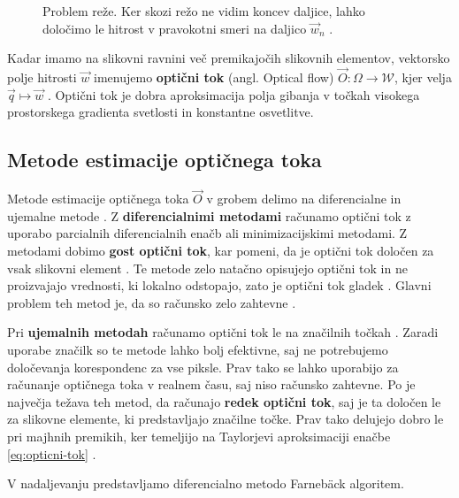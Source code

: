 \begin{figure}[htb]
\centering

\caption[Problem reže]{Problem reže. Ker skozi režo ne vidim koncev daljice, lahko določimo le hitrost v pravokotni smeri na daljico $\vec{w}_n$ \cite{trucco1998introductory}.}
\label{fig:aperture-problem}
\end{figure}




Kadar imamo na slikovni ravnini več premikajočih slikovnih elementov, vektorsko polje hitrosti $\vec{w}$ imenujemo \textbf{optični tok} (angl. Optical flow) $\vec{O}: \mathit{\Omega} \to \mathcal{W}$, kjer velja $ \vec{q} \mapsto \vec{w}$ \cite{trucco1998introductory}. Optični tok je dobra aproksimacija polja gibanja v točkah visokega prostorskega gradienta svetlosti in konstantne osvetlitve.



\subsection{Metode estimacije optičnega toka}\label{sec:metode-of}

Metode estimacije optičnega toka $\vec{O}$ v grobem delimo na diferencialne in {ujemalne} metode \cite{trucco1998introductory}. Z \textbf{diferencialnimi metodami} računamo optični tok z uporabo parcialnih diferencialnih enačb ali minimizacijskimi metodami. Z metodami dobimo \textbf{gost optični tok}, kar pomeni, da je optični tok določen za vsak slikovni element \cite{trucco1998introductory}. Te metode zelo natačno opisujejo optični tok in ne proizvajajo vrednosti, ki lokalno odstopajo, zato je optični tok gladek \cite{brox2011large}.  Glavni problem teh metod je, da so računsko zelo zahtevne \cite{trucco1998introductory}.

Pri \textbf{ujemalnih metodah} računamo optični tok le na značilnih točkah \cite{trucco1998introductory}. Zaradi uporabe značilk so te metode lahko bolj efektivne, saj ne potrebujemo določevanja korespondenc za vse piksle. Prav tako se lahko uporabijo za računanje optičnega toka v realnem času, saj niso računsko zahtevne. Po \cite{trucco1998introductory} je največja težava teh metod, da računajo \textbf{redek optični tok}, saj je ta določen le za slikovne elemente, ki predstavljajo značilne točke. Prav tako delujejo dobro le pri majhnih premikih, ker temeljijo na Taylorjevi aproksimaciji enačbe \eqref{eq:opticni-tok} \cite{wedel2011stereo}. 

V nadaljevanju predstavljamo diferencialno metodo Farneb{\"a}ck algoritem.

